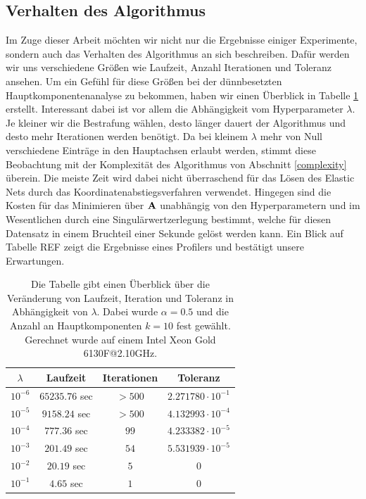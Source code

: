 

\subsection{Verhalten des Algorithmus}

Im Zuge dieser Arbeit möchten wir nicht nur die Ergebnisse einiger Experimente, sondern auch das Verhalten des Algorithmus an sich beschreiben. Dafür werden wir uns verschiedene Größen wie Laufzeit, Anzahl Iterationen und Toleranz ansehen. Um ein Gefühl für diese Größen bei der dünnbesetzten Hauptkomponentenanalyse zu bekommen, haben wir einen Überblick in Tabelle \ref{algorithm_analysis_table} erstellt. Interessant dabei ist vor allem die Abhängigkeit vom Hyperparameter $\lambda$. Je kleiner wir die Bestrafung wählen, desto länger dauert der Algorithmus und desto mehr Iterationen werden benötigt. Da bei kleinem $\lambda$ mehr von Null verschiedene Einträge in den Hauptachsen erlaubt werden, stimmt diese Beobachtung mit der Komplexität des Algorithmus von Abschnitt \ref{complexity} überein. Die meiste Zeit wird dabei nicht überraschend für das Lösen des Elastic Nets durch das Koordinatenabstiegsverfahren verwendet. Hingegen sind die Kosten für das Minimieren über $\mathbf{A}$ unabhängig von den Hyperparametern und im Wesentlichen durch eine Singulärwertzerlegung bestimmt, welche für diesen Datensatz in einem Bruchteil einer Sekunde gelöst werden kann. Ein Blick auf Tabelle REF zeigt die Ergebnisse eines Profilers und bestätigt unsere Erwartungen.

\setlength{\tabcolsep}{12pt}
\begin{table}
\centering
\begin{tabular}{cccc}
\boldmath$\lambda$ & \textbf{Laufzeit} & \textbf{Iterationen} & \textbf{Toleranz}\\\hline\addlinespace
$10^{-6}$ & $65235.76$ sec & $>500$ & $2.271780 \cdot 10^{-1}$\\
$10^{-5}$ & $9158.24$ sec & $>500$ & $4.132993 \cdot 10^{-4}$\\
$10^{-4}$ & $777.36$ sec & $99$ & $4.233382 \cdot 10^{-5}$\\
$10^{-3}$ & $201.49$ sec & $54$ & $5.531939 \cdot 10^{-5}$\\
$10^{-2}$ & $20.19$ sec & $5$ & $0$\\
$10^{-1}$ & $4.65$ sec & $1$ & $0$\\
\end{tabular}
\caption{Die Tabelle gibt einen Überblick über die Veränderung von Laufzeit, Iteration und Toleranz in Abhängigkeit von $\lambda$. Dabei wurde $\alpha=0.5$ und die Anzahl an Hauptkomponenten $k=10$ fest gewählt.\\Gerechnet wurde auf einem Intel Xeon Gold 6130F@2.10GHz.}
\label{algorithm_analysis_table}
\end{table}
\setlength{\tabcolsep}{6pt}

